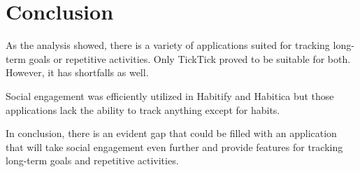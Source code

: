 
\section{Conclusion}\label{sec:conclusion}

As the analysis showed, there is a variety of applications suited for tracking long-term goals or repetitive activities.
Only TickTick proved to be suitable for both.
However, it has shortfalls as well.

Social engagement was efficiently utilized in Habitify and Habitica
but those applications lack the ability to track anything except for habits.

In conclusion, there is an evident gap that could be filled with an application that will take social engagement even further and provide
features for tracking long-term goals and repetitive activities.
